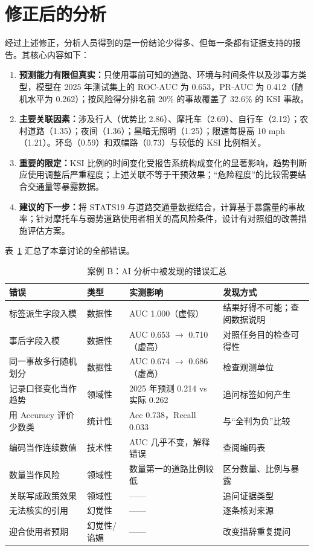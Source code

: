 \section{修正后的分析}

经过上述修正，分析人员得到的是一份结论少得多、但每一条都有证据支持的报告。其核心内容如下：

\begin{enumerate}
  \item \textbf{预测能力有限但真实：}只使用事前可知的道路、环境与时间条件以及涉事方类型，模型在 2025 年测试集上的 ROC-AUC 为 0.653，PR-AUC 为 0.412（随机水平为 0.262）；按风险得分排名前 20\% 的事故覆盖了 32.6\% 的 KSI 事故。
  \item \textbf{主要关联因素：}涉及行人（优势比 2.86）、摩托车（2.69）、自行车（2.12）；农村道路（1.35）；夜间（1.36）；黑暗无照明（1.25）；限速每提高 10 mph（1.21）。环岛（0.59）和双幅路（0.73）与较低的 KSI 比例相关。
  \item \textbf{重要的限定：}KSI 比例的时间变化受报告系统构成变化的显著影响，趋势判断应使用调整后严重程度；上述关联不等于干预效果；“危险程度”的比较需要结合交通量等暴露数据。
  \item \textbf{建议的下一步：}将 STATS19 与道路交通量数据结合，计算基于暴露量的事故率；针对摩托车与弱势道路使用者相关的高风险条件，设计有对照组的改善措施评估方案。
\end{enumerate}

表~\ref{tab:ch17_summary} 汇总了本章讨论的全部错误。

\begin{table}[H]
\centering
\caption{案例 B：AI 分析中被发现的错误汇总}
\label{tab:ch17_summary}
\small
\begin{tabular}{p{3.4cm}p{1.5cm}p{3.6cm}p{4.4cm}}
\toprule
错误 & 类型 & 实测影响 & 发现方式 \\
\midrule
标签派生字段入模 & 数据性 & AUC 1.000（虚假） & 结果好得不可能；查阅数据说明 \\
事后字段入模 & 数据性 & AUC 0.653 $\rightarrow$ 0.710（虚高） & 对照任务目的检查可得性 \\
同一事故多行随机划分 & 数据性 & AUC 0.674 $\rightarrow$ 0.686（虚高） & 检查观测单位 \\
记录口径变化当作趋势 & 领域性 & 2025 年预测 0.214 vs 实际 0.262 & 追问标签如何产生 \\
用 Accuracy 评价少数类 & 统计性 & Acc 0.738，Recall 0.033 & 与“全判为负”比较 \\
编码当作连续数值 & 技术性 & AUC 几乎不变，解释错误 & 查阅编码表 \\
数量当作风险 & 领域性 & 数量第一的道路比例较低 & 区分数量、比例与暴露 \\
关联写成政策效果 & 领域性 & —— & 追问证据类型 \\
无法核实的引用 & 幻觉性 & —— & 逐条核对来源 \\
迎合使用者预期 & 幻觉性/谄媚 & —— & 改变措辞重复提问 \\
\bottomrule
\end{tabular}
\end{table}

